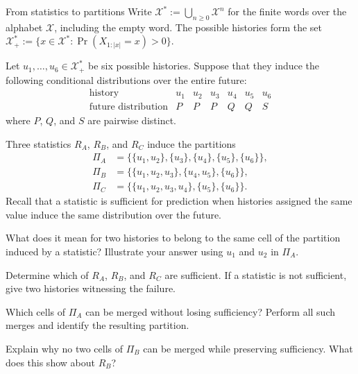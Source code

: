\begin{exercise}[Core]{From statistics to partitions}
  Write $\mathcal X^*:=\bigcup_{n\geq 0}\mathcal X^n$ for the finite words
  over the alphabet $\mathcal X$, including the empty word. The possible histories
  form the set $\mathcal X_+^*:=\{x\in\mathcal X^* \mathrel{:} \Pr(X_{1:|x|}=x)>0\}$.

  Let $u_1,\ldots,u_6\in\mathcal X_+^*$ be six possible histories. Suppose
  that they induce the following conditional distributions over the entire
  future:
  \[
    \begin{array}{c|cccccc}
      \text{history} & u_1 & u_2 & u_3 & u_4 & u_5 & u_6\\
      \hline
      \text{future distribution} & P & P & P & Q & Q & S
    \end{array}
  \]
  where $P$, $Q$, and $S$ are pairwise distinct.

  Three statistics $R_A$, $R_B$, and $R_C$ induce the partitions
  \[
    \begin{aligned}
      \Pi_A
        &=\bigl\{\{u_1,u_2\},\{u_3\},\{u_4\},\{u_5\},\{u_6\}\bigr\},\\
      \Pi_B
        &=\bigl\{\{u_1,u_2,u_3\},\{u_4,u_5\},\{u_6\}\bigr\},\\
      \Pi_C
        &=\bigl\{\{u_1,u_2,u_3,u_4\},\{u_5\},\{u_6\}\bigr\}.
    \end{aligned}
  \]
  Recall that a statistic is sufficient for prediction when histories assigned
  the same value induce the same distribution over the future.

  \begin{parts}
    \item What does it mean for two histories to belong to the same cell of the
      partition induced by a statistic? Illustrate your answer using $u_1$ and
      $u_2$ in $\Pi_A$.

    \item Determine which of $R_A$, $R_B$, and $R_C$ are sufficient. If a
      statistic is not sufficient, give two histories witnessing the failure.

    \item Which cells of $\Pi_A$ can be merged without losing sufficiency?
      Perform all such merges and identify the resulting partition.

    \item Explain why no two cells of $\Pi_B$ can be merged while preserving
      sufficiency. What does this show about $R_B$?


\end{parts}
\end{exercise}
